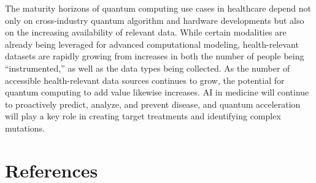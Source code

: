 \documentclass{scrartcl}
\begin{document}
The maturity horizons of quantum computing use cases in healthcare depend not only on cross-industry quantum algorithm and hardware developments but also on the increasing availability of relevant data. While certain modalities are already being leveraged for advanced computational modeling, health-relevant datasets are rapidly growing from increases in both the number of people being “instrumented,” as well as the data types being collected. As the number of accessible health-relevant data sources continues to grow, the potential for quantum computing to add value likewise increases. AI in medicine will continue to proactively predict, analyze, and prevent disease, and quantum acceleration will play a key role in creating target treatments and identifying complex mutations.

\section{References}
\label{sec:org5d12cd4}
\end{document}
